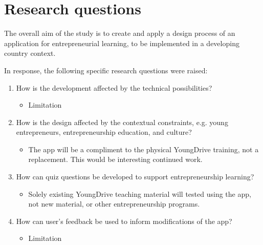 \section{Research questions}

The overall aim of the study is to create and apply a design process of an application for entrepreneurial learning, to be implemented in a developing country context.

In response, the following specific research questions were raised:

\begin{enumerate}
    \item How is the development affected by the technical possibilities?
    \begin{itemize}
    \item Limitation 
    \end{itemize}

    \item How is the design affected by the contextual  constraints, e.g. young entrepreneurs, entrepreneurship education, and culture? %
    \begin{itemize}
        \item The app will be a compliment to the physical YoungDrive training, not a replacement. This would be interesting continued work.
    \end{itemize}


    \item How can quiz questions be developed to support entrepreneurship learning? %
    \begin{itemize}
        \item Solely existing YoungDrive teaching material will tested using the app, not new material, or other entrepreneurship programs.
    \end{itemize}

    \item How can user’s feedback be used to inform modifications of the app?
    \begin{itemize}
        \item Limitation 
    \end{itemize}


\end{enumerate}
